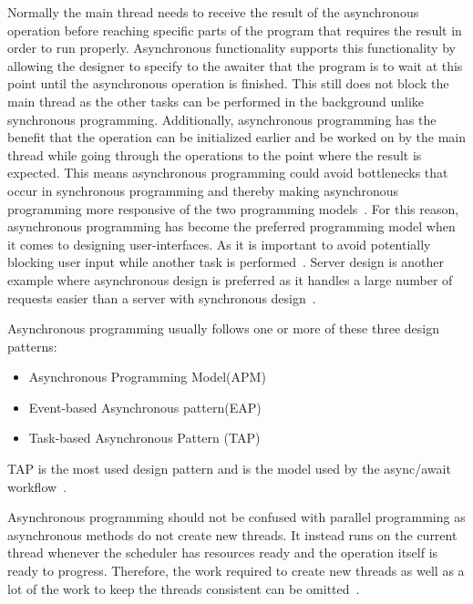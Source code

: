 Normally the main thread needs to receive the result of the asynchronous operation before reaching specific parts of the program that requires the result in order to run properly. Asynchronous functionality supports this functionality by allowing the designer to specify to the awaiter that the program is to wait at this point until the asynchronous operation is finished. This still does not block the main thread as the other tasks can be performed in the background unlike synchronous programming. Additionally, asynchronous programming has the benefit that the operation can be initialized earlier and be worked on by the main thread while going through the operations to the point where the result is expected. This means asynchronous programming could avoid bottlenecks that occur in synchronous programming and thereby making asynchronous programming more responsive of the two programming models~\cite{DOC:TaskAsyncProgModel, WEB:AsyncAwaitTut}.
For this reason, asynchronous programming has become the preferred programming model when it comes to designing user-interfaces. As it is important to avoid potentially blocking user input while another task is performed~\cites{VIDEO:AsyncConBack}[p.~214]{BOOK:DotnetMultithreadCookBook}. Server design is another example where asynchronous design is preferred as it handles a large number of requests easier than a server with synchronous design~\cite{VIDEO:AsyncConBack, DOC:AsyncAwait}.

Asynchronous programming usually follows one or more of these three design patterns:
\begin{itemize}
	\item{Asynchronous Programming Model(APM)}
	\item{Event-based Asynchronous pattern(EAP)}
	\item{Task-based Asynchronous Pattern (TAP)}
\end{itemize}
TAP is the most used design pattern and is the model used by the async/await workflow~\cite{DOC:AsyncAwait, WEB:AsyncAwaitTut}.

Asynchronous programming should not be confused with parallel programming as asynchronous methods do not create new threads. It instead runs on the current thread whenever the scheduler has resources ready and the operation itself is ready to progress. Therefore, the work required to create new threads as well as a lot of the work to keep the threads consistent can be omitted~\cite{DOC:TaskAsyncProgModel}. %

